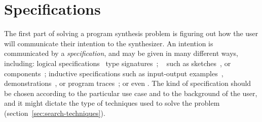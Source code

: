 \section{Specifications}
\label{sec:specifications}

The first part of solving a program synthesis problem is figuring out how the
user will communicate their intention to the synthesizer. An intention is
communicated by a \textit{specification}, and may be given in many different
ways, including: logical specifications~\cite{Itzhaky:SIS:2010}  type signatures~\cite{Osera:2015:TPS,
Frankle:2016:EST, Polikarpova:2016:PSP}; ~\cite{Alur:sygus:2013} such as sketches~\cite{Solar-Lezama:2008}, or
components~\cite{Feng:2017:CST, Feng:2017:CSC, Feng:2018:PSU, Shi:2019:FCS};
inductive specifications such as input-output examples~\cite{Frankle:2016:EST,
Gulwani:2012:SDM, Leung:2015:IPS}, demonstrations~\cite{Lau2003}, or program
traces~\cite{Lau:traces:2003}; or even . The kind
of specification should be chosen according to the particular use case and to
the background of the user, and it might dictate the type of techniques used to
solve the problem (section~\ref{sec:search-techniques}).






